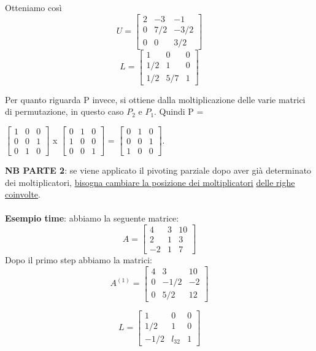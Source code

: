Otteniamo così 
$$ U =
\begin{bmatrix}
2 & -3 & -1 \\
0 & 7/2 & -3/2 \\
0 & 0 & 3/2
\end{bmatrix}
$$
$$ L =
\begin{bmatrix}
1 & 0 & 0 \\
1/2 & 1 & 0 \\
1/2 & 5/7 & 1 
\end{bmatrix}
$$

Per quanto riguarda P invece, si ottiene dalla moltiplicazione delle varie matrici di permutazione, in questo caso $P_2$ e $P_1$. Quindi P = \\
\begin{center}
$
\begin{bmatrix}
1 & 0 & 0 \\
0 & 0 & 1 \\
0 & 1 & 0 
\end{bmatrix}
$
x
$
\begin{bmatrix}
0 & 1 & 0 \\
1 & 0 & 0 \\
0 & 0 & 1 
\end{bmatrix}
$
=
$
\begin{bmatrix}
0 & 1 & 0 \\
0 & 0 & 1 \\
1 & 0 & 0 
\end{bmatrix}
$.
\end{center}

\textbf{NB PARTE 2}: se viene applicato il pivoting parziale dopo aver già determinato dei moltiplicatori, \underline{bisogna cambiare la posizione dei moltiplicatori} \underline{delle righe coinvolte}.\\\\
\textbf{Esempio time}: abbiamo la seguente matrice:
$$ A =
\begin{bmatrix}
4 & 3 & 10 \\
2 & 1 & 3 \\
-2 & 1 & 7
\end{bmatrix}
$$
\noindent
Dopo il primo step abbiamo la matrici:\\

$$ A^{(1)} =
\begin{bmatrix}
4 & 3 & 10 \\
0 & -1/2 & -2 \\
0 & 5/2 & 12 
\end{bmatrix}
$$
\noindent

$$ L =
\begin{bmatrix}
1 & 0 & 0 \\
1/2 & 1 & 0 \\
- 1/2 & l_{32} & 1 
\end{bmatrix}
$$

